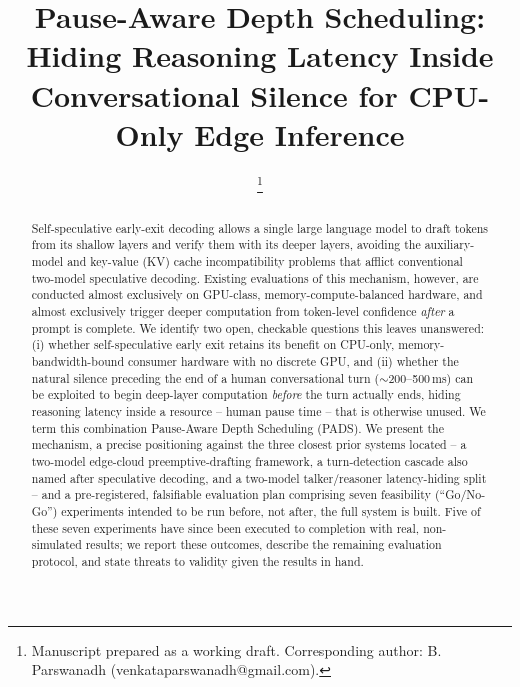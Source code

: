 \documentclass[journal]{IEEEtran}
\begin{document}
\title{Pause-Aware Depth Scheduling: Hiding Reasoning Latency Inside \\ Conversational Silence for CPU-Only Edge Inference}

\author{%
    \thanks{Manuscript prepared as a working draft. Corresponding author: B. Parswanadh (venkataparswanadh@gmail.com).}
}


\maketitle

\begin{abstract}
Self-speculative early-exit decoding allows a single large language model to draft tokens from its shallow layers and verify them with its deeper layers, avoiding the auxiliary-model and key-value (KV) cache incompatibility problems that afflict conventional two-model speculative decoding. Existing evaluations of this mechanism, however, are conducted almost exclusively on GPU-class, memory-compute-balanced hardware, and almost exclusively trigger deeper computation from token-level confidence \emph{after} a prompt is complete. We identify two open, checkable questions this leaves unanswered: (i) whether self-speculative early exit retains its benefit on CPU-only, memory-bandwidth-bound consumer hardware with no discrete GPU, and (ii) whether the natural silence preceding the end of a human conversational turn ($\sim$200--500\,ms) can be exploited to begin deep-layer computation \emph{before} the turn actually ends, hiding reasoning latency inside a resource -- human pause time -- that is otherwise unused. We term this combination Pause-Aware Depth Scheduling (PADS). We present the mechanism, a precise positioning against the three closest prior systems located -- a two-model edge-cloud preemptive-drafting framework, a turn-detection cascade also named after speculative decoding, and a two-model talker/reasoner latency-hiding split -- and a pre-registered, falsifiable evaluation plan comprising seven feasibility (``Go/No-Go'') experiments intended to be run before, not after, the full system is built. Five of these seven experiments have since been executed to completion with real, non-simulated results; we report these outcomes, describe the remaining evaluation protocol, and state threats to validity given the results in hand.
\end{abstract}
\end{document}
